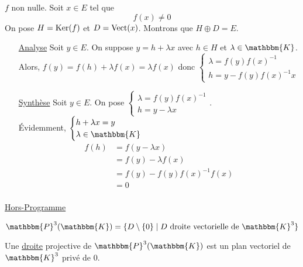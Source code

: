 \begin{prv}
	$f$ non nulle. Soit $x \in E$ tel que \[
		f(x) \neq 0
	\] On pose $H = \operatorname{Ker}(f)$ et $D = \operatorname{Vect}(x)$. Montrons que $H \oplus D = E$.\\
	\begin{itemize}
		\item[\underline{\sc Analyse}] Soit $y \in E$. On suppose $y = h + \lambda x$ avec $h \in H$ et $\lambda \in \mathbbm{K}$. Alors, $f(y) = f(h) + \lambda f(x) = \lambda f(x)$ donc $\begin{cases}
			\lambda = f(y) f(x)^{-1}\\
			h = y - f(y) f(x)^{-1} x
		\end{cases}$\\
	\item[\underline{\sc Synthèse}] Soit $y\in E$. On pose $\begin{cases}
		\lambda = f(y) f(x)^{-1}\\
		h = y - \lambda x
	\end{cases}$.\\
	Évidemment, $\begin{cases}
		h + \lambda x = y\\
		\lambda \in \mathbbm{K}
	\end{cases}$ 
	\begin{align*}
		f(h) &= f(y - \lambda x) \\
		&= f(y) - \lambda f(x) \\
		&= f(y) - f(y)f(x)^{-1} f(x) \\
		&= 0 \\
	\end{align*}
	\end{itemize}
\end{prv}

\begin{center}
	\sc\LARGE\underline{Hors-Programme}
\end{center}

\[
	\mathbbm{P}^3 (\mathbbm{K}) = \{D \setminus \{0\}  \mid  D \text{ droite vectorielle de }\mathbbm{K}^3\}
\] 

Une \underline{droite} projective de $\mathbbm{P}^3(\mathbbm{K})$ est un plan vectoriel de $\mathbbm{K}^3$ privé de $0$.


